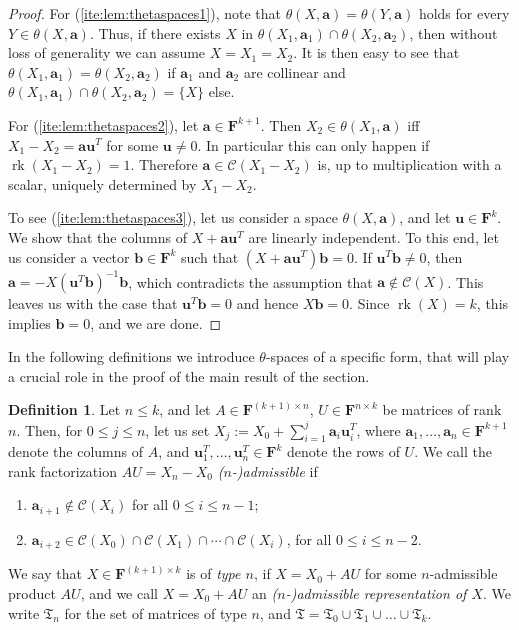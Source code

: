 \documentclass[11pt]{amsart}
\theoremstyle{plain}
\theoremstyle{definition}
\newtheorem{definition}[thm]{Definition}
\newcommand{\F}{{\mathbf F}}
\renewcommand\vec{\mathbf}
\newcommand{\va}{\vec{a}}
\newcommand{\vb}{\vec{b}}
\newcommand{\vu}{\vec{u}}
\DeclareMathOperator{\rk}{rk}
\newcommand{\Col}[1]{\mathcal{C}(#1)}
\begin{document}
\begin{proof}
For (\ref{ite:lem:thetaspaces1}), note that $\theta(X,\va) = \theta(Y,\va)$ holds for every $Y \in \theta(X,\va)$. Thus, 
if there exists $X$ in $\theta(X_1,\va_1) \cap \theta(X_2,\va_2)$, then without loss of generality we can assume $X = X_1 = X_2$. It is then easy to see that $\theta(X_1,\va_1) = \theta(X_2,\va_2)$ if $\va_1$ and $\va_2$ are collinear and $\theta(X_1,\va_1) \cap \theta(X_2,\va_2) = \{X\}$ else. 

For (\ref{ite:lem:thetaspaces2}), let $\va\in \F^{k+1}$. Then
$X_2 \in \theta(X_1,\va)$ iff $X_1-X_2 = \va \vu^T$ for some $\vu \neq 0$. 
In particular this can only happen if $\rk(X_1-X_2) = 1$. Therefore $\va \in \Col{X_1-X_2}$ is, up to multiplication with a scalar, uniquely determined by $X_1-X_2$.

To see (\ref{ite:lem:thetaspaces3}), let us consider a space 
$\theta(X,\va)$, and let $\vu\in \F^{k}$. We show that the columns of $X + \va \vu^T$ are linearly independent. 
To this end, let us consider a vector $\vb \in \F^{k}$ such that $(X + \va \vu^T)\vb = 0$. 
If $\vu^T \vb \neq 0$, then $\va = -X(\vu^T \vb)^{-1} \vb $, which contradicts the assumption that $\va\notin \Col{X}$. 
This leaves us with the case that $\vu^T \vb = 0$ and hence $X\vb = 0$. Since $\rk(X) = k$, this implies $\vb = 0$, and we are done.
\end{proof}

In the following definitions we introduce $\theta$-spaces of a specific form, that will play a crucial role in the proof of the main result of the section.

\begin{definition} \label{definition:type}
Let $n \leq k$, and let $A \in \F^{(k+1) \times n}$, $U \in \F^{n \times k}$ be matrices of rank $n$. Then, for $0 \leq j \leq n$, let us set $X_j := X_0 + \sum_{i=1}^j \va_i \vu_i^T$, 
where $\va_1,\ldots,\va_n \in \F^{k+1}$ denote the columns of $A$, and $\vu_1^T,\ldots,\vu_n^T \in \F^{k}$ denote the rows of $U$. 
We call the rank factorization $AU = X_n-X_0$ \emph{($n$-)admissible} if
\begin{enumerate}
\item $\va_{i+1} \notin 
\Col{X_i}$ for all $0 \leq i \leq n-1$;
\item $\va_{i+2} \in \Col{X_0} \cap \Col{X_1} \cap \cdots \cap \Col{X_i}$, for all $0 \leq i \leq n-2$.
\end{enumerate}
We say that $X \in \F^{(k+1)\times k}$ is of \emph{type $n$}, if $X = X_0 + AU$ for some $n$-admissible product $AU$, and we call $X= X_0 +AU$ an \emph{($n$-)admissible representation of $X$}. We write $\mathfrak T_n$ for the set of matrices of type $n$, and $\mathfrak T = \mathfrak T_0 \cup \mathfrak T_1 \cup \ldots \cup \mathfrak T_k$.
\end{definition}
\end{document}
